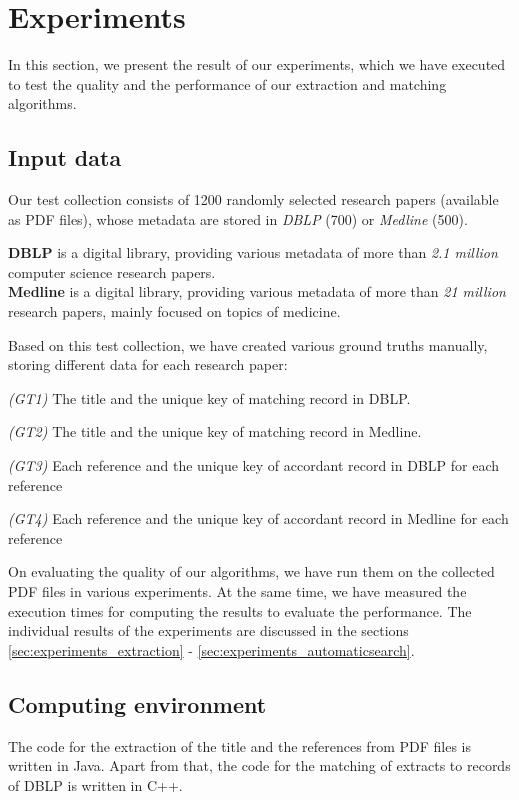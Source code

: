 \section{Experiments}\label{sec:experiments}
In this section, we present the result of our experiments, which we have executed to test the quality and the performance of our extraction and matching algorithms. 

\subsection{Input data}
Our test collection consists of 1200 randomly selected research papers (available as PDF files), whose metadata are stored in \textit{DBLP} (700) or \textit{Medline} (500). 

\medskip\noindent
{\bf DBLP} is a digital library, providing various metadata of more than \textit{2.1 million} computer science research papers.\\[5pt]
\noindent
{\bf Medline} is a digital library, providing various metadata of more than \textit{21 million} research papers, mainly focused on topics of medicine. 
\medskip

Based on this test collection, we have created various ground truths manually, storing different data for each research paper:

\par\medskip\noindent
\textit{(GT1)} The title and the unique key of matching record in DBLP.
\par\medskip\noindent
\textit{(GT2)} The title and the unique key of matching record in Medline.
\par\medskip\noindent
\textit{(GT3)} Each reference and the unique key of accordant record in DBLP for each reference 
\par\medskip\noindent
\textit{(GT4)} Each reference and the unique key of accordant record in Medline for each reference 
\medskip

On evaluating the quality of our algorithms, we have run them on the collected PDF files in various experiments. At the same time, we have measured the execution times for computing the results to evaluate the performance. The individual results of the experiments are discussed in the sections \ref{sec:experiments_extraction} - \ref{sec:experiments_automaticsearch}.

\subsection{Computing environment}
The code for the extraction of the title and the references from PDF files is written in Java. Apart from that, the code for the matching of extracts to records of DBLP is written in C++.

